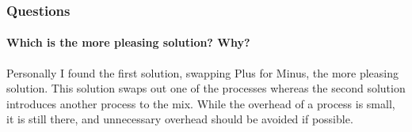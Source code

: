 \subsubsection*{Questions}

\paragraph{Which is the more pleasing solution? Why?}

Personally I found the first solution, swapping Plus for Minus, the more pleasing solution.  This solution swaps out one of the processes whereas the second solution introduces another process to the mix.  While the overhead of a process is small, it is still there, and unnecessary overhead should be avoided if possible.
